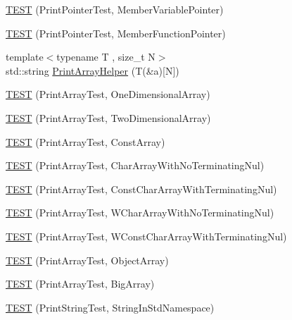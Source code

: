 \begin{DoxyCompactItemize}
\mbox{\hyperlink{namespacetesting_1_1gtest__printers__test_a434cafcc1dbee409992bbb1593034480}{T\+E\+ST}} (Print\+Pointer\+Test, Member\+Variable\+Pointer)
\item 
\mbox{\hyperlink{namespacetesting_1_1gtest__printers__test_a9d998b210890d3d7e085d01c457f650f}{T\+E\+ST}} (Print\+Pointer\+Test, Member\+Function\+Pointer)
\item 
{\footnotesize template$<$typename T , size\+\_\+t N$>$ }\\std\+::string \mbox{\hyperlink{namespacetesting_1_1gtest__printers__test_a694f23c5a8c134f0e6e24a412f8d75c1}{Print\+Array\+Helper}} (T(\&a)\mbox{[}N\mbox{]})
\item 
\mbox{\hyperlink{namespacetesting_1_1gtest__printers__test_a3845c4717b03cb5ad309c7d9a37acb0a}{T\+E\+ST}} (Print\+Array\+Test, One\+Dimensional\+Array)
\item 
\mbox{\hyperlink{namespacetesting_1_1gtest__printers__test_ac366b9ec749b2499d21583d3b8f86273}{T\+E\+ST}} (Print\+Array\+Test, Two\+Dimensional\+Array)
\item 
\mbox{\hyperlink{namespacetesting_1_1gtest__printers__test_a8b5638f178c12f58707ca0f02a3b4d41}{T\+E\+ST}} (Print\+Array\+Test, Const\+Array)
\item 
\mbox{\hyperlink{namespacetesting_1_1gtest__printers__test_a3bae023a42049745b49fa1f2db9a0cb2}{T\+E\+ST}} (Print\+Array\+Test, Char\+Array\+With\+No\+Terminating\+Nul)
\item 
\mbox{\hyperlink{namespacetesting_1_1gtest__printers__test_ab51b9ecaca7d635326101b23d5e8afd2}{T\+E\+ST}} (Print\+Array\+Test, Const\+Char\+Array\+With\+Terminating\+Nul)
\item 
\mbox{\hyperlink{namespacetesting_1_1gtest__printers__test_ac19ec2732031bfe83b30ea9f00259ef3}{T\+E\+ST}} (Print\+Array\+Test, W\+Char\+Array\+With\+No\+Terminating\+Nul)
\item 
\mbox{\hyperlink{namespacetesting_1_1gtest__printers__test_a6a7cbcdbe748a1d4e90658f48f36c9da}{T\+E\+ST}} (Print\+Array\+Test, W\+Const\+Char\+Array\+With\+Terminating\+Nul)
\item 
\mbox{\hyperlink{namespacetesting_1_1gtest__printers__test_af91d8ad9d6c7547913fe05c7acc44114}{T\+E\+ST}} (Print\+Array\+Test, Object\+Array)
\item 
\mbox{\hyperlink{namespacetesting_1_1gtest__printers__test_a596493b56489aa1571fa26d1402e7116}{T\+E\+ST}} (Print\+Array\+Test, Big\+Array)
\item 
\mbox{\hyperlink{namespacetesting_1_1gtest__printers__test_abbd355e76033f0defd76c37523ad0f60}{T\+E\+ST}} (Print\+String\+Test, String\+In\+Std\+Namespace)

\end{DoxyCompactItemize}
